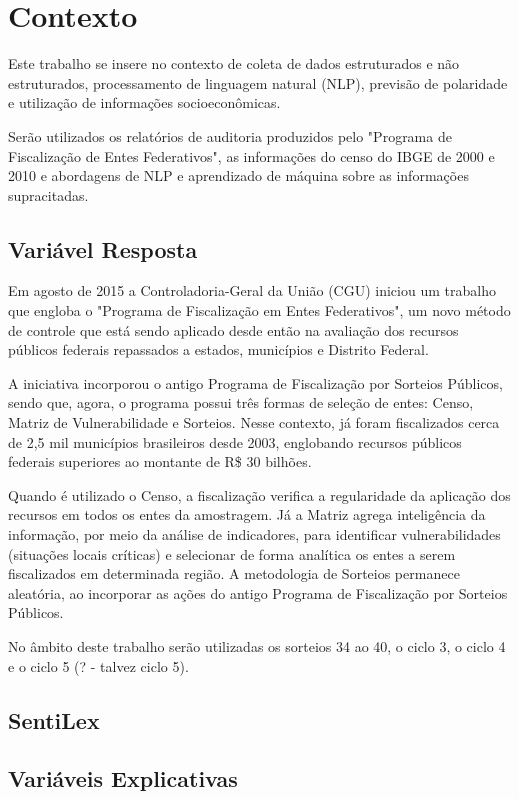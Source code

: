 \chapter{Contexto}
\label{cap:contexto}

Este trabalho se insere no contexto de coleta de dados estruturados e não estruturados, processamento de linguagem natural (NLP), previsão de polaridade e utilização de informações socioeconômicas.

Serão utilizados os relatórios de auditoria produzidos pelo "Programa de Fiscalização de Entes Federativos", as informações do censo do IBGE de 2000 e 2010 e abordagens de NLP e aprendizado de máquina sobre as informações supracitadas.

\section{Variável Resposta}
\label{sec:variavel_resposta}

Em agosto de 2015 a Controladoria-Geral da União (CGU) iniciou um trabalho que engloba o "Programa de Fiscalização em Entes Federativos", um novo método de controle que está sendo aplicado desde então na avaliação dos recursos públicos federais repassados a estados, municípios e Distrito Federal.

A iniciativa incorporou o antigo Programa de Fiscalização por Sorteios Públicos, sendo que, agora, o programa possui três formas de seleção de entes: Censo, Matriz de Vulnerabilidade e Sorteios. Nesse contexto, já foram fiscalizados cerca de 2,5 mil municípios brasileiros desde 2003, englobando recursos públicos federais superiores ao montante de R\$ 30 bilhões.

Quando é utilizado o Censo, a fiscalização verifica a regularidade da aplicação dos recursos em todos os entes da amostragem. Já a Matriz agrega inteligência da informação, por meio da análise de indicadores, para identificar vulnerabilidades (situações locais críticas) e selecionar de forma analítica os entes a serem fiscalizados em determinada região. A metodologia de Sorteios permanece aleatória, ao incorporar as ações do antigo Programa de Fiscalização por Sorteios Públicos.

No âmbito deste trabalho serão utilizadas os sorteios 34 ao 40, o ciclo 3, o ciclo 4 e o ciclo 5 (? - talvez ciclo 5).


\section{SentiLex}
\label{sec:sentilex}



\section{Variáveis Explicativas}
\label{sec:variaveis_explicativas}







